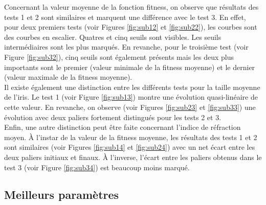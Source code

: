\documentclass[a4paper,11pt]{article}
\begin{document}
Concernant la valeur moyenne de la fonction fitness, on observe que résultats des tests 1 et 2 sont similaires et marquent une différence avec le test 3. En effet, pour deux premiers tests (voir Figures \ref{fig:sub12} et \ref{fig:sub22}), les courbes sont des courbes en escalier. Quatres et cinq seuils sont visibles. Les seuils intermédiaires sont les plus marqués. En revanche, pour le troisième test (voir Figure \ref{fig:sub32}), cinq seuils sont également présents mais les deux plus importants sont le premier (valeur minimale de la fitness moyenne) et le dernier (valeur maximale de la fitness moyenne).\\

Il existe également une distinction entre les différents tests pour la taille moyenne de l'iris. Le test 1 (voir Figure \ref{fig:sub13}) montre une évolution quasi-linéaire de cette valeur. En revanche, on observe (voir Figures \ref{fig:sub23} et \ref{fig:sub33}) une évolution avec deux paliers fortement distingués pour les tests 2 et 3.\\

Enfin, une autre distinction peut être faite concernant l'indice de réfraction moyen. À l'instar de la valeur de la fitness moyenne, les résultats des tests 1 et 2 sont similaires (voir Figures \ref{fig:sub14} et \ref{fig:sub24}) avec un net écart entre les deux paliers initiaux et finaux. À l'inverse, l'écart entre les paliers obtenus dans le test 3 (voir Figure \ref{fig:sub34}) est beaucoup moins marqué.

\subsection{Meilleurs paramètres}
\end{document}
